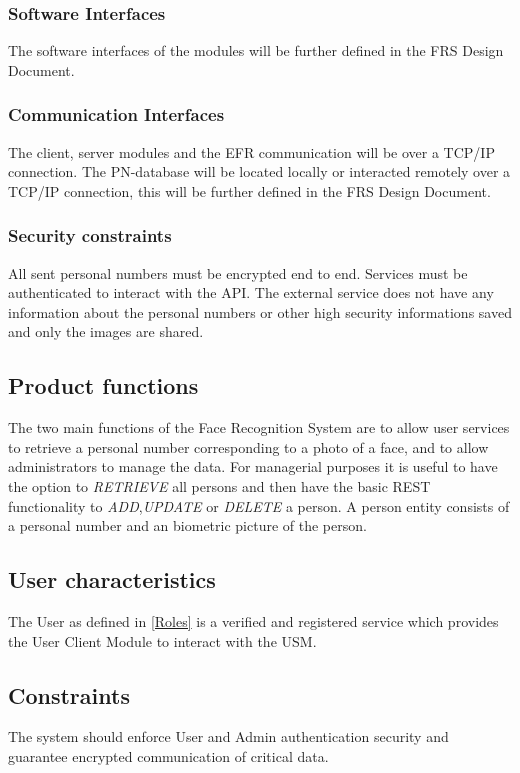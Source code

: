 \documentclass[a4paper,11pt]{article}
\begin{document}
\subsubsection{Software Interfaces}
The software interfaces of the modules will be further defined in the FRS Design Document.

\subsubsection{Communication Interfaces}
The client, server modules and the EFR communication will be over a TCP/IP connection.
The PN-database will be located locally or interacted remotely over a TCP/IP connection, this will be further defined in the FRS Design Document.

\subsubsection{Security constraints}
All sent personal numbers must be encrypted end to end. Services must be authenticated to interact with the API. The external service does not have any information about the personal numbers or other high security informations saved and only the images are shared.

\subsection{Product functions}
The two main functions of the Face Recognition System are to allow user services to retrieve a personal number corresponding to a photo of a face, and to allow administrators to manage the data.
\newline
\noindent
For managerial purposes it is useful to have the option to \textit{RETRIEVE} all persons and then have the basic REST functionality to \textit{ADD},\textit{UPDATE} or \textit{DELETE} a person. A person entity consists of a personal number and an biometric picture of the person.

\subsection{User characteristics}
The User as defined in \ref{Roles} is a verified and registered service which provides the User Client Module to interact with the USM.

\subsection{Constraints}
The system should enforce User and Admin authentication security and guarantee encrypted communication of critical data.
 
\end{document}
